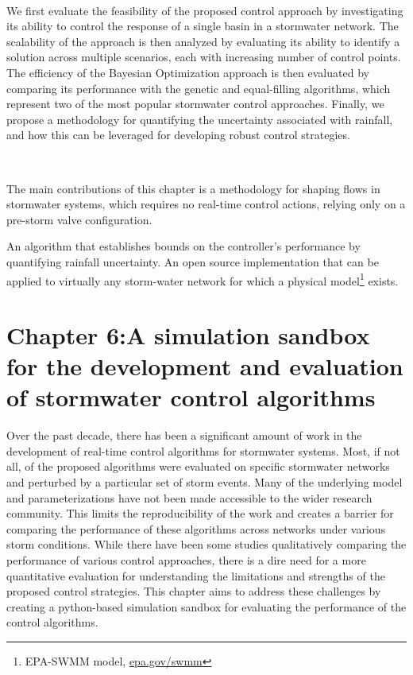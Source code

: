 \

We first evaluate the feasibility of the proposed control approach by investigating its ability to control the response of a single basin in a stormwater network.
The scalability of the approach is then analyzed by evaluating its ability to identify a solution across multiple scenarios, each with increasing number of control points.
The efficiency of the Bayesian Optimization approach is then evaluated by comparing its performance with the genetic and equal-filling algorithms, which represent two of the most popular stormwater control approaches. 
Finally, we propose a methodology for quantifying the uncertainty associated with rainfall, and how this can be leveraged for developing robust control strategies.

\

The main contributions of this chapter is a methodology for shaping flows in stormwater systems, which requires no real-time control actions, relying only on a pre-storm valve configuration.

An algorithm that establishes bounds on the controller's performance by quantifying rainfall uncertainty.
An open source implementation that can be applied to virtually any storm-water network for which a physical model\footnote{EPA-SWMM model, \href{https://www.epa.gov/water-research/storm-water-management-model-swmm}{epa.gov/swmm}} exists.

\section[\texttt{pystorms}]{Chapter 6:A simulation sandbox for the development and evaluation of stormwater control algorithms}

Over the past decade, there has been a significant amount of work in the development of real-time control algorithms for stormwater systems.
Most, if not all, of the proposed algorithms were evaluated on specific stormwater networks and perturbed by a particular set of storm events.
Many of the underlying model and parameterizations have not been made accessible to the wider research community.
This limits the reproducibility of the work and creates a barrier for comparing the performance of these algorithms across networks under various storm conditions.
While there have been some studies qualitatively comparing the performance of various control approaches, there is a dire need for a more quantitative evaluation for understanding the limitations and strengths of the proposed control strategies.
This chapter aims to address these challenges by creating a python-based simulation sandbox for evaluating the performance of the control algorithms.

